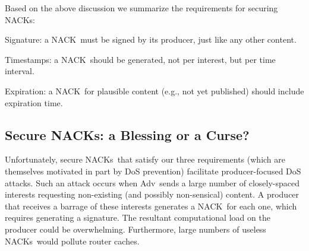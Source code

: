 \documentclass[conference]{IEEEtran}
\newcommand{\Adv}{Adv}
\newcommand{\cnack}{\mbox{\sf {\cal c}NACK}}
\newcommand{\cnacks}{\mbox{\sf {\cal c}NACK}s}
\newcommand{\ignore}[1]{}
\begin{document}
\ignore{As mentioned above, \cnacks\ are treated similar to content objects with type \texttt{DATA}, thus, they 
might be cached by routers. Although challenge-based \cnacks\ only benefit from the cache in case of 
retransmission, timestamp-based \cnacks\ can be cached and used to satisfy future interests. However, there 
are some considerations regarding the latter's \texttt{Freshness}. Producers must not set \texttt{Freshness} 
to be larger than the accepted time window. If a cached \cnack\ is served after the window elapsed, it will 
be considered invalid and dropped by receiving consumers. Moreover, \cnacks\ are cache-agnostic. Imagine an 
network architecture that follows the exact same design and requirements as NDN/CCNx but does not implement 
in-network caching. In this case, secure \cnacks\ can still be implemented. The only difference is that all 
interests requesting non-existing content must reach their corresponding producers in order 
to be satisfied with \cnacks. Furthermore, if this hypothetical architecture dictates routers to include 
traversed path information in interests instead of using PITs, interest flooding attacks on routers cannot 
be mounted as explained above. Therefore, \cnacks\ will no longer be helpful in reducing the effects of such 
attacks, but can still be beneficial for informing consumers about requested non-existing content.
} Based on the above discussion we summarize the requirements for securing \cnacks:
\begin{compactenum}
\item Signature: a \cnack\ must be signed by its producer, just like any other content.
\item Timestamps: a \cnack\ should be generated, not per interest, but per time interval.
\item Expiration: a \cnack\ for plausible content (e.g., not yet published) should include expiration time.
\end{compactenum}

\subsection{Secure \cnacks: a Blessing or a Curse?}\label{subsec:secure-cnack_implications}
Unfortunately, secure \cnacks\ that satisfy our three requirements (which are themselves 
motivated in part by DoS prevention) facilitate producer-focused DoS attacks.
Such an attack occurs when \Adv\ sends a large number of closely-spaced interests requesting 
non-existing (and possibly non-sensical) content. A producer that receives a barrage of these
interests generates a \cnack\ for each one, which requires generating a signature. The resultant
computational load on the producer could be overwhelming. Furthermore, large numbers of
useless \cnacks\ would pollute router caches.
\end{document}
